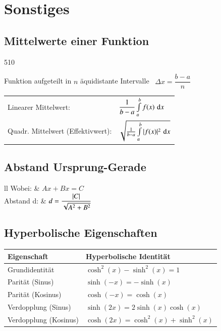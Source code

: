 \section{Sonstiges}	

\begin{minipage}[t]{0.49\columnwidth}
    \subsection{Mittelwerte einer Funktion}{510}	

    Funktion aufgeteilt in $n$ äquidistante Intervalle \textrightarrow\ $\Delta x = \dfrac{b-a}{n}$

    \renewcommand{\arraystretch}{3}
    \begin{tabular}{ll}
        Linearer Mittelwert:                & $\dfrac{1}{b-a} \int \limits_{a}^{b} f(x) \, \mathop{} \! \mathrm{d} x$                 \\
        Quadr. Mittelwert (Effektivwert):   & $\sqrt{\frac{1}{b-a} \int \limits_{a}^{b} | f(x) |^2 \, \mathop{} \! \mathrm{d} x}$
    \end{tabular}
    \subsection{Abstand Ursprung-Gerade}
    \renewcommand{\arraystretch}{1.9}
    \begin{ctabular}{ll}
        Wobei: & $Ax + Bx = C$\\
        Abstand d: & $d = \dfrac{\left|C\right|}{\sqrt{A^2+B^2}}$
    \end{ctabular}
    \subsection{Hyperbolische Eigenschaften}
    \begin{tabular}{|l|l|}
        \hline
        \textbf{Eigenschaft} & \textbf{Hyperbolische Identität} \\ \hline
        Grundidentität & $\cosh^2(x) - \sinh^2(x) = 1$ \\ \hline
        Parität (Sinus) & $\sinh(-x) = -\sinh(x)$ \\ \hline
        Parität (Kosinus) & $\cosh(-x) = \cosh(x)$ \\ \hline
        Verdopplung (Sinus) & $\sinh(2x) = 2\sinh(x)\cosh(x)$ \\ \hline
        Verdopplung (Kosinus) & $\cosh(2x) = \cosh^2(x) + \sinh^2(x)$ \\ \hline
    \end{tabular}
    \renewcommand{\arraystretch}{1}

\end{minipage}
